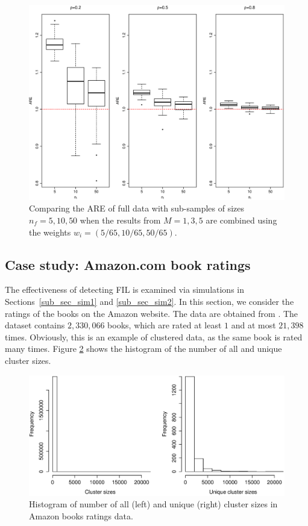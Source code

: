 \documentclass[11pt,a5paper,twoside]{book}
\begin{document}
\begin{figure}[!t]
\centering
\includegraphics[width=\textwidth]{fig_comb.eps}
\caption{Comparing the ARE of full data with sub-samples of sizes $n_f=5,10,50$ when the results from $M=1,3,5$ are combined using the weights $w_i= (5/65,10/65,50/65)$.} 
\label{fig_comb}
\end{figure}  


\subsection{Case study: Amazon.com book ratings}
\label{sec_case_study}
The effectiveness of detecting FIL is examined via simulations in Sections~\ref{sub_sec_sim1} and \ref{sub_sec_sim2}. In this section, we consider the ratings of the books on the Amazon website. The data are obtained from \cite{amazon}. The dataset contains $2,330,066$ books, which are rated at least $1$ and at most $21,398$ times. Obviously, this is an example of clustered data, as the same book is rated many times. Figure \ref{fig_hist} shows the histogram of the number of all and unique cluster sizes.


\begin{figure}[!t]
\centering
\includegraphics[width=\textwidth,trim=0 85 0 0]{fig_hist_full_clust_size.eps}
\caption[Histogram of number of all and unique cluster sizes in Amazon books ratings data.]{Histogram of number of all (left) and unique (right) cluster sizes in Amazon books ratings data.} 
\label{fig_hist}
\end{figure}  
\end{document}

